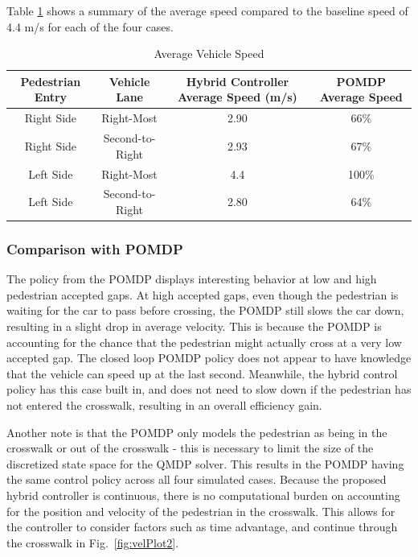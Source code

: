 \documentclass[letterpaper, 10 pt, conference]{ieeeconf}  %
\begin{document}
Table \ref{tb:speeds} shows a summary of the average speed compared to the baseline speed of 4.4 m/s for each of the four cases.

\begin{table}[h]
\begin{center}
\caption{Average Vehicle Speed}\label{tb:speeds}
\begin{tabular}{cccc}
Pedestrian Entry & Vehicle Lane & Hybrid Controller Average Speed (m/s) & POMDP Average Speed \\\hline\hline

Right Side & Right-Most & 2.90 & 66\% \\
Right Side & Second-to-Right & 2.93 & 67\% \\
Left Side  & Right-Most & 4.4 & 100\% \\
Left Side  & Second-to-Right & 2.80 & 64\% \\\hline

\end{tabular}
\end{center}
\end{table}

\subsubsection{Comparison with POMDP}
The policy from the POMDP displays interesting behavior at low and high pedestrian accepted gaps. At high accepted gaps, even though the pedestrian is waiting for the car to pass before crossing, the POMDP still slows the car down, resulting in a slight drop in average velocity. This is because the POMDP is accounting for the chance that the pedestrian might actually cross at a very low accepted gap. The closed loop POMDP policy does not appear to have knowledge that the vehicle can speed up at the last second. Meanwhile, the hybrid control policy has this case built in, and does not need to slow down if the pedestrian has not entered the crosswalk, resulting in an overall efficiency gain. 

Another note is that the POMDP only models the pedestrian as being in the crosswalk or out of the crosswalk - this is necessary to limit the size of the discretized state space for the QMDP solver. This results in the POMDP having the same control policy across all four simulated cases. Because the proposed hybrid controller is continuous, there is no computational burden on accounting for the position and velocity of the pedestrian in the crosswalk. This allows for the controller to consider factors such as time advantage, and continue through the crosswalk in Fig.~\ref{fig:velPlot2}. 
\end{document}
